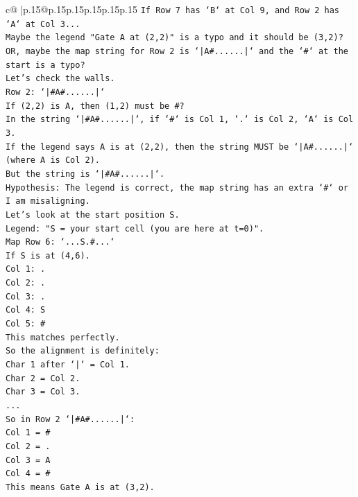 \documentclass{article}
\begin{document}
{\begin{supertabular}{c@{$\;$}|p{.15\linewidth}@{}p{.15\linewidth}p{.15\linewidth}p{.15\linewidth}p{.15\linewidth}p{.15\linewidth}}
{{{\texttt{If Row 7 has `B` at Col 9, and Row 2 has `A` at Col 3...} \\
\texttt{Maybe the legend "Gate A at (2,2)" is a typo and it should be (3,2)?} \\
\texttt{OR, maybe the map string for Row 2 is `|A\#......|` and the `\#` at the start is a typo?} \\
\texttt{Let's check the walls.} \\
\texttt{Row 2: `|\#A\#......|`} \\
\texttt{If (2,2) is A, then (1,2) must be \#?} \\
\texttt{In the string `|\#A\#......|`, if `\#` is Col 1, `.` is Col 2, `A` is Col 3.} \\
\texttt{If the legend says A is at (2,2), then the string MUST be `|A\#......|` (where A is Col 2).} \\
\texttt{But the string is `|\#A\#......|`.} \\
\texttt{Hypothesis: The legend is correct, the map string has an extra `\#` or I am misaligning.} \\
\texttt{Let's look at the start position S.} \\
\texttt{Legend: "S = your start cell (you are here at t=0)".} \\
\texttt{Map Row 6: `...S.\#...`} \\
\texttt{If S is at (4,6).} \\
\texttt{Col 1: .} \\
\texttt{Col 2: .} \\
\texttt{Col 3: .} \\
\texttt{Col 4: S} \\
\texttt{Col 5: \#} \\
\texttt{This matches perfectly.} \\
\texttt{So the alignment is definitely:} \\
\texttt{Char 1 after `|` = Col 1.} \\
\texttt{Char 2 = Col 2.} \\
\texttt{Char 3 = Col 3.} \\
\texttt{...} \\
\texttt{So in Row 2 `|\#A\#......|`:} \\
\texttt{Col 1 = \#} \\
\texttt{Col 2 = .} \\
\texttt{Col 3 = A} \\
\texttt{Col 4 = \#} \\
\texttt{This means Gate A is at (3,2).} \\
}}}
\end{supertabular}}
\end{document}
